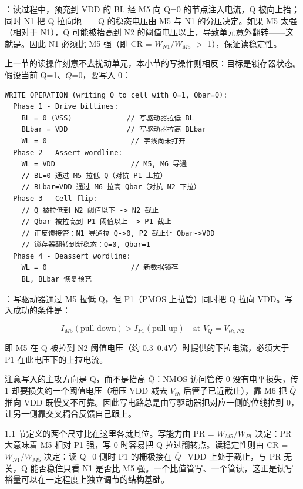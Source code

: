 ：读过程中，预充到 VDD 的 BL 经 M5 向 Q=0 的节点注入电流，Q 被向上抬；同时 N1 把 Q 拉向地——Q 的稳态电压由 M5 与 N1 的分压决定。如果 M5 太强（相对于 N1），Q 可能被抬高到 N2 的阈值电压以上，导致单元意外翻转——这就是。因此 N1 必须比 M5 强（即 CR = $W_{N1}/W_{M5}$ $>$ 1），保证读稳定性。


上一节的读操作刻意不去扰动单元，本小节的写操作则相反：目标是锁存器状态。假设当前 Q=1、$\overline{Q}$=0，要写入 0：

\begin{lstlisting}
WRITE OPERATION (writing 0 to cell with Q=1, Qbar=0):
  Phase 1 - Drive bitlines:
    BL = 0 (VSS)             // 写驱动器拉低 BL
    BLbar = VDD              // 写驱动器拉高 BLbar
    WL = 0                    // 字线尚未打开
  Phase 2 - Assert wordline:
    WL = VDD                  // M5, M6 导通
    // BL=0 通过 M5 拉低 Q（对抗 P1 上拉）
    // BLbar=VDD 通过 M6 拉高 Qbar（对抗 N2 下拉）
  Phase 3 - Cell flip:
    // Q 被拉低到 N2 阈值以下 -> N2 截止
    // Qbar 被拉高到 P1 阈值以上 -> P1 截止
    // 正反馈接管：N1 导通拉 Q->0, P2 截止让 Qbar->VDD
    // 锁存器翻转到新稳态：Q=0, Qbar=1
  Phase 4 - Deassert wordline:
    WL = 0                    // 新数据锁存
    BL, BLbar 恢复预充
\end{lstlisting}

：写驱动器通过 M5 拉低 Q，但 P1（PMOS 上拉管）同时把 Q 拉向 VDD。写入成功的条件是：

$$I_{M5}(\text{pull-down}) > I_{P1}(\text{pull-up}) \quad \text{at } V_Q = V_{th,N2}$$

即 M5 在 Q 被拉到 N2 阈值电压（约 0.3--0.4V）时提供的下拉电流，必须大于 P1 在此电压下的上拉电流。

注意写入的主攻方向是 Q，而不是抬高 $\overline{Q}$：NMOS 访问管传 0 没有电平损失，传 1 却要损失约一个阈值电压（栅压 VDD 减去 $V_{th}$ 后管子已近截止），靠 M6 把 $\overline{Q}$ 推向 VDD 既慢又不可靠。因此写电路总是由写驱动器把对应一侧的位线拉到 0，让另一侧靠交叉耦合反馈自己跟上。

1.1 节定义的两个尺寸比在这里各就其位。写能力由 PR = $W_{M5}/W_{P1}$ 决定：PR 大意味着 M5 相对 P1 强，写 0 时容易把 Q 拉过翻转点。读稳定性则由 CR = $W_{N1}/W_{M5}$ 决定：读 Q=0 侧时 P1 的栅极接在 $\overline{Q}$=VDD 上处于截止，与 PR 无关，Q 能否稳住只看 N1 是否比 M5 强。一个比值管写、一个管读，这正是读写裕量可以在一定程度上独立调节的结构基础。

